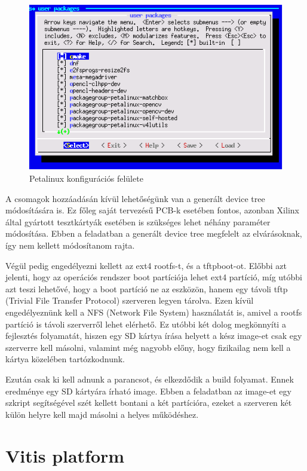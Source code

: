 \begin{figure}[!ht]
    \centering
    \includegraphics[width=150mm, keepaspectratio]{figures/plnx.png}
    \caption{Petalinux konfigurációs felülete}
\end{figure}

A csomagok hozzáadásán kívül lehetőségünk van a generált device tree módosítására is. Ez főleg saját tervezésű PCB-k esetében fontos, azonban Xilinx által gyártott tesztkártyák esetében is szükséges lehet néhány paraméter módosítása. Ebben a feladatban a generált device tree megfelelt az elvárásoknak, így nem kellett módosítanom rajta.

Végül pedig engedélyezni kellett az ext4 rootfs-t, és a tftpboot-ot. Előbbi azt jelenti, hogy az operációs rendszer boot partíciója lehet ext4 partíció, míg utóbbi azt teszi lehetővé, hogy a boot partíció ne az eszközön, hanem egy távoli tftp (Trivial File Transfer Protocol) szerveren legyen tárolva. Ezen kívül engedélyeznünk kell a NFS (Network File System) használatát is, amivel a rootfs partíció is távoli szerverről lehet elérhető. Ez utóbbi két dolog megkönnyíti a fejlesztés folyamatát, hiszen egy SD kártya írása helyett a kész image-et csak egy szerverre kell másolni, valamint még nagyobb előny, hogy fizikailag nem kell a kártya közelében tartózkodnunk.

Ezután csak ki kell adnunk a  parancsot, és elkezdődik a build folyamat. Ennek eredménye egy SD kártyára írható image. Ebben a feladatban az image-et egy szkript segítségével szét kellett bontani a két partícióra, ezeket a szerveren két külön helyre kell majd másolni a helyes működéshez.

\section{Vitis platform}

